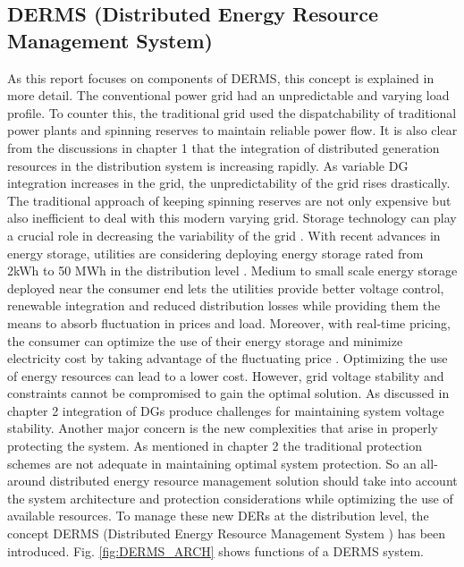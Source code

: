 \subsection{DERMS (Distributed Energy Resource Management System)}
As this report focuses on components of DERMS, this concept is explained in more detail. The conventional power grid had an unpredictable and varying load profile. To counter this, the traditional grid used the dispatchability of traditional power plants and spinning reserves to maintain reliable power flow. It is also clear from the discussions in chapter 1 that the integration of distributed generation resources in the distribution system is increasing rapidly. As variable DG integration increases in the grid, the unpredictability of the grid rises drastically. The traditional approach of keeping spinning reserves are not only expensive but also inefficient to deal with this modern varying grid. Storage technology can play a crucial role in decreasing the variability of the grid \cite{USD13}. With recent advances in energy storage, utilities are considering deploying energy storage rated from 2kWh to 50 MWh in the distribution level \cite{Cle12}. Medium to small scale energy storage deployed near the consumer end lets the utilities provide better voltage control, renewable integration and reduced distribution losses while providing them the means to absorb fluctuation in prices and load. Moreover, with real-time pricing, the consumer can optimize the use of their energy storage and minimize electricity cost by taking advantage of the fluctuating price \cite{BPR11,PMv13,ASB17}.
Optimizing the use of energy resources can lead to a lower cost. However, grid voltage stability and constraints cannot be compromised to gain the optimal solution. As discussed in chapter 2 integration of DGs produce challenges for maintaining system voltage stability. Another major concern is the new complexities that arise in properly protecting the system. As mentioned in chapter 2 the traditional protection schemes are not adequate in maintaining optimal system protection. 
So an all-around distributed energy resource management solution should take into account the system architecture and protection considerations while optimizing the use of available resources.
To manage these new DERs at the distribution level, the concept DERMS (Distributed Energy Resource Management System
) has been introduced. Fig. \ref{fig:DERMS_ARCH} shows functions of a DERMS system. 

